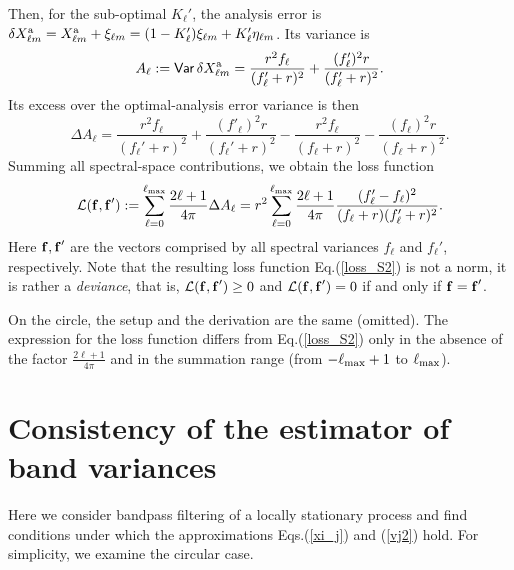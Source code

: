 \documentclass[12pt]{article}
\newcommand{\Var}{{\mathsf{Var}}\,}
\begin{document}
Then, for the sub-optimal $K_\ell'$, the analysis error is  
$\delta X^{\rm a}_{\ell m} = X^{\rm a}_{\ell m} +\xi_{\ell m} = (1-K_\ell')\xi_{\ell m} +  K_\ell' \eta_{\ell m}$.
Its variance is
%
\begin {equation}
\label{dXa}
A_\ell := \Var \delta X^{\rm a}_{\ell m}= 
  \frac{r^2 f_\ell}{(f_\ell' + r)^2} + \frac{(f'_\ell)^2 r}{(f_\ell' + r)^2}.
\end {equation}
%
Its excess over the optimal-analysis error variance is then
%
\begin {equation}
\label{dXa2}
\Delta A_\ell =  \frac{r^2 f_\ell}{(f_\ell' + r)^2} + \frac{(f'_\ell)^2 r}{(f_\ell' + r)^2} - 
                 \frac{r^2 f_\ell}{(f_\ell + r)^2}  - \frac{(f_\ell)^2  r}{(f_\ell  + r)^2}.
\end {equation}
%
Summing all spectral-space contributions, we obtain the loss function 
%
\begin {equation}
\label{loss_S2}
{\cal L}({\bf f, f}') := \sum_{\ell=0}^{\ell_{\rm max}} \frac{2\ell +1}{4\pi} \Delta A_\ell =  
  r^2 \sum_{\ell=0}^{\ell_{\rm max}}\frac{2\ell +1}{4\pi} \frac{(f'_\ell - f_\ell)^2}{(f_\ell  + r) (f'_\ell  + r)^2}.
\end {equation}
%
Here ${\bf f, f}'$ are the vectors comprised by all spectral variances
$f_\ell$ and $f_\ell'$, respectively.
Note that the resulting loss function Eq.(\ref{loss_S2}) is not a norm, it is rather a {\em deviance}, that is,
${\cal L}({\bf f, f}') \ge 0$  and ${\cal L}({\bf f, f}') = 0$ if and only if ${\bf f = f}'$.

On the circle, the setup and the derivation are the same (omitted). The expression for the 
loss function differs from Eq.(\ref{loss_S2}) only in the absence of the factor 
$\frac{2\ell +1}{4\pi}$ and in the summation range (from $-\ell_{\rm max}+1$ to $\ell_{\rm max}$).







\section{Consistency of the estimator of band variances}
\label{App_consist}



Here we consider  bandpass filtering of a locally stationary process
and find conditions under which the approximations Eqs.(\ref{xi_j}) and (\ref{vj2}) hold.
For simplicity, we examine the circular case.
\end{document}
